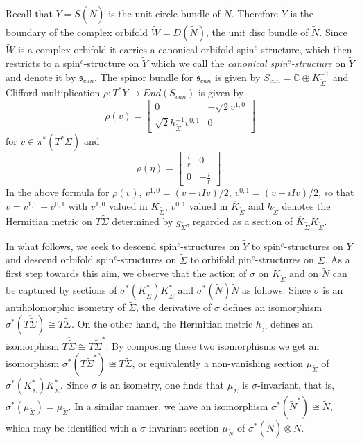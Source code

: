\documentclass{amsart}
\theoremstyle{definition}
\theoremstyle{remark}
\numberwithin{equation}{section}
\begin{document}
Recall that $\widetilde{Y} = S(\widetilde{N})$ is the unit circle bundle of $\widetilde{N}$. Therefore $\widetilde{Y}$ is the boundary of the complex orbifold $\widetilde{W} = D(\widetilde{N})$, the unit disc bundle of $\widetilde{N}$. Since $\widetilde{W}$ is a complex orbifold it carries a canonical orbifold spin$^c$-structure, which then restricts to a spin$^c$-structure on $\widetilde{Y}$ which we call the {\em canonical spin$^c$-structure} on $\widetilde{Y}$ and denote it by $\mathfrak{s}_{can}$. The spinor bundle for $\mathfrak{s}_{can}$ is given by $S_{can} = \mathbb{C} \oplus K_{\widetilde{\Sigma}}^{-1}$ and Clifford multiplication $\rho : T^*\widetilde{Y} \to End(S_{can})$ is given by
\begin{equation}\label{equ:Cliff}
\rho( v ) = \left[ \begin{matrix} 0 & -\sqrt{2} v^{1,0} \\ \sqrt{2} h_{\widetilde{\Sigma}}^{-1} v^{0,1} & 0 \end{matrix} \right]
\end{equation}
for $v \in \pi^*( T^* \widetilde{\Sigma})$ and
\[
\rho( \eta ) = \left[ \begin{matrix} \frac{i}{r} & 0 \\ 0 & -\frac{i}{r} \end{matrix} \right].
\]
In the above formula for $\rho(v)$, $v^{1,0} = (v - iIv)/2$, $v^{0,1} = (v+iIv)/2$, so that $v = v^{1,0} + v^{0,1}$ with $v^{1,0}$ valued in $K_{\widetilde{\Sigma}}$, $v^{0,1}$ valued in $\overline{K}_{\widetilde{\Sigma}}$ and $h_{\widetilde{\Sigma}}$ denotes the Hermitian metric on $T\widetilde{\Sigma}$ determined by $g_{\widetilde{\Sigma}}$, regarded as a section of $\overline{K}_{\widetilde{\Sigma}} K_{\widetilde{\Sigma}}$.

In what follows, we seek to descend spin$^c$-structures on $\widetilde{Y}$ to spin$^c$-structures on $Y$ and descend orbifold spin$^c$-structures on $\widetilde{\Sigma}$ to orbifold pin$^c$-structures on $\Sigma$. As a first step towards this aim, we observe that the action of $\sigma$ on $K_{\widetilde{\Sigma}}$ and on $\widetilde{N}$ can be captured by sections of $\sigma^*(K_{\widetilde{\Sigma}}^*) K_{\widetilde{\Sigma}}^*$ and $\sigma^*(\widetilde{N})\widetilde{N}$ as follows. Since $\sigma$ is an antiholomorphic isometry of $\widetilde{\Sigma}$, the derivative of $\sigma$ defines an isomorphism $\sigma^*(\overline{T\widetilde{\Sigma}}) \cong T\widetilde{\Sigma}$. On the other hand, the Hermitian metric $h_{\widetilde{\Sigma}}$ defines an isomorphism $\overline{T\widetilde{\Sigma}} \cong T\widetilde{\Sigma}^*$. By composing these two isomorphisms we get an isomorphism $\sigma^*(T\widetilde{\Sigma}^*) \cong T\widetilde{\Sigma}$, or equivalently a non-vanishing section $\mu_{\widetilde{\Sigma}}$ of $\sigma^*( K_{\widetilde{\Sigma}}^* ) K_{\widetilde{\Sigma}}^*$. Since $\sigma$ is an isometry, one finds that $\mu_{\widetilde{\Sigma}}$ is $\sigma$-invariant, that is, $\sigma^*( \mu_{\widetilde{\Sigma}}) = \mu_{\widetilde{\Sigma}}$. In a similar manner, we have an isomorphism $\sigma^*( \widetilde{N}^* ) \cong \overline{\widetilde{N}}$, which may be identified with a $\sigma$-invariant section $\mu_{\widetilde{N}}$ of $\sigma^*(\widetilde{N}) \otimes \widetilde{N}$.
\end{document}

